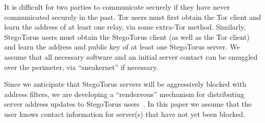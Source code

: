 It is difficult for two parties to communicate securely if they have
never communicated securely in the past.  Tor users must first obtain
the Tor client and learn the address of at least one relay, via some
extra-Tor method.  Similarly, StegoTorus users must obtain the
StegoTorus client (as well as the Tor client) and learn the address
and public key of at least one StegoTorus server.  We assume that
all necessary software and an initial server contact can be smuggled
over the perimeter, via “sneakernet” if necessary.

Since we anticipate that StegoTorus servers will be aggressively
blocked with address filters, we are developing a “rendezvous”
mechanism for distributing server address updates to StegoTorus
users~\cite{c-rendezvous}.  In this paper we assume that the user
knows contact information for server(s) that have not yet been
blocked.
